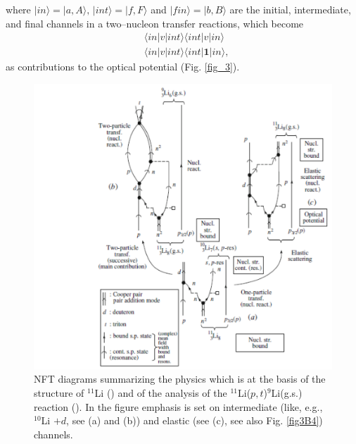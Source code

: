 where $|in\rangle=|a,A\rangle,\,|int\rangle=|f,F\rangle$ and $|fin\rangle=|b,B\rangle$ are the initial, intermediate, and final channels in a two--nucleon transfer reactions, which become
\begin{equation}
\begin{split}
&\langle in|v|int\rangle\langle int |v|in\rangle\\
&\langle in|v|int\rangle\langle int |\mathbf{1}|in\rangle,
\end{split}
\end{equation}
as contributions to the optical potential (Fig. \ref{fig_3}).

\begin{figure}
\centerline{\includegraphics*[width=15cm,angle=0]{nutshell/figs/fig3B3.pdf}}
\caption{NFT diagrams summarizing the physics which is at the basis of the structure of $^{11}$Li (\cite{Barranco:01}) and of the analysis of the
$^{11}$Li($p, t$)$^{9}$Li(g.s.) reaction (\cite{Potel:10}). In the figure emphasis is
set on intermediate (like, e.g., $^{10}$Li $+d$, see (a) and (b)) and elastic (see (c), see also Fig. \ref{fig3B4}) channels.}\label{fig3B3}
\end{figure}
